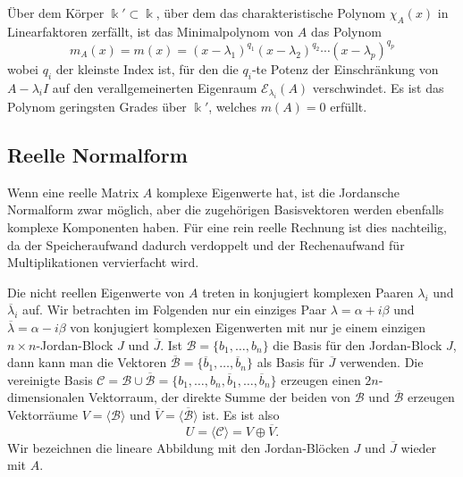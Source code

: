\begin{satz}[Minimalpolynom]
Über dem Körper $\Bbbk'\subset\Bbbk$, über dem das charakteristische
Polynom $\chi_A(x)$ in Linearfaktoren zerfällt, ist das Minimalpolynom
von $A$ das Polynom
\[
m_A(x)
=
m(x)
=
(x-\lambda_1)^{q_1}
(x-\lambda_2)^{q_2}
\cdots
(x-\lambda_p)^{q_p}
\]
wobei $q_i$ der kleinste Index ist, für den die $q_i$-te Potenz
der Einschränkung von $A-\lambda_i I$ auf den verallgemeinerten Eigenraum
$\mathcal{E}_{\lambda_i}(A)$ verschwindet.
Es ist das Polynom geringsten Grades über $\Bbbk'$, welches $m(A)=0$ erfüllt.
\end{satz}


\subsection{Reelle Normalform
\label{buch:subsection:reelle-normalform}}
Wenn eine reelle Matrix $A$ komplexe Eigenwerte hat, ist die Jordansche
Normalform zwar möglich, aber die zugehörigen Basisvektoren werden ebenfalls
komplexe Komponenten haben.
Für eine rein reelle Rechnung ist dies nachteilig, da der Speicheraufwand
dadurch verdoppelt und der Rechenaufwand für Multiplikationen vervierfacht
wird.

Die nicht reellen Eigenwerte von $A$ treten in konjugiert komplexen Paaren
$\lambda_i$ und $\overline{\lambda}_i$ auf.
Wir betrachten im Folgenden nur ein einziges Paar $\lambda=\alpha+i\beta$ und
$\overline{\lambda}=\alpha-i\beta$ von konjugiert komplexen Eigenwerten mit
nur je einem einzigen $n\times n$-Jordan-Block $J$ und $\overline{J}$.
Ist $\mathcal{B}=\{b_1,\dots,b_n\}$ die Basis für den Jordan-Block $J$,
dann kann man die Vektoren
$\overline{\mathcal{B}}=\{\overline{b}_1,\dots,\overline{b}_n\}$ als Basis für
$\overline{J}$ verwenden.
Die vereinigte Basis
$\mathcal{C} = \mathcal{B}\cup\overline{\mathcal{B}}
= \{b_1,\dots,b_n,\overline{b}_1,\dots,\overline{b}_n\}$
erzeugen einen $2n$-dimensionalen Vektorraum,
der direkte Summe der beiden von $\mathcal{B}$ und $\overline{\mathcal{B}}$
erzeugen Vektorräume $V=\langle\mathcal{B}\rangle$ und
$\overline{V}=\langle\overline{\mathcal{B}}\rangle$ ist.
Es ist also
\[
U=\langle \mathcal{C}\rangle
=
V\oplus \overline{V}.
\]
Wir bezeichnen die lineare Abbildung mit den Jordan-Blöcken
$J$ und $\overline{J}$ wieder mit $A$.

